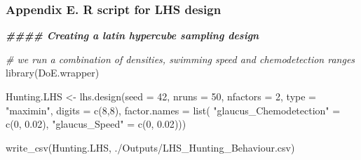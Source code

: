 \documentclass[
]{article}
\newenvironment{Shaded}{\begin{snugshade}}{\end{snugshade}}
\newcommand{\AttributeTok}[1]{\textcolor[rgb]{0.77,0.63,0.00}{#1}}
\newcommand{\CommentTok}[1]{\textcolor[rgb]{0.56,0.35,0.01}{\textit{#1}}}
\newcommand{\DecValTok}[1]{\textcolor[rgb]{0.00,0.00,0.81}{#1}}
\newcommand{\DocumentationTok}[1]{\textcolor[rgb]{0.56,0.35,0.01}{\textbf{\textit{#1}}}}
\newcommand{\FloatTok}[1]{\textcolor[rgb]{0.00,0.00,0.81}{#1}}
\newcommand{\FunctionTok}[1]{\textcolor[rgb]{0.00,0.00,0.00}{#1}}
\newcommand{\NormalTok}[1]{#1}
\newcommand{\OtherTok}[1]{\textcolor[rgb]{0.56,0.35,0.01}{#1}}
\newcommand{\StringTok}[1]{\textcolor[rgb]{0.31,0.60,0.02}{#1}}
\begin{document}
\hypertarget{appendix-e.-r-script-for-lhs-design}{%
\subsubsection{Appendix E. R script for LHS
design}\label{appendix-e.-r-script-for-lhs-design}}

\begin{Shaded}
\begin{Highlighting}[]
\DocumentationTok{\#\#\#\# Creating a latin hypercube sampling design}

\CommentTok{\# we run a combination of densities, swimming speed and chemodetection ranges}
\FunctionTok{library}\NormalTok{(DoE.wrapper)}


\NormalTok{Hunting.LHS }\OtherTok{\textless{}{-}} \FunctionTok{lhs.design}\NormalTok{(}\AttributeTok{seed =} \DecValTok{42}\NormalTok{,}
  \AttributeTok{nruns =} \DecValTok{50}\NormalTok{,}
  \AttributeTok{nfactors =} \DecValTok{2}\NormalTok{,}
  \AttributeTok{type =} \StringTok{"maximin"}\NormalTok{,}
  \AttributeTok{digits =} \FunctionTok{c}\NormalTok{(}\DecValTok{8}\NormalTok{,}\DecValTok{8}\NormalTok{),}
  \AttributeTok{factor.names =} \FunctionTok{list}\NormalTok{(}
    \StringTok{"glaucus\_Chemodetection"} \OtherTok{=} \FunctionTok{c}\NormalTok{(}\DecValTok{0}\NormalTok{, }\FloatTok{0.02}\NormalTok{),}
    \StringTok{"glaucus\_Speed"} \OtherTok{=} \FunctionTok{c}\NormalTok{(}\DecValTok{0}\NormalTok{, }\FloatTok{0.02}\NormalTok{)))}

\FunctionTok{write\_csv}\NormalTok{(Hunting.LHS, }\StringTok{\textquotesingle{}./Outputs/LHS\_Hunting\_Behaviour.csv\textquotesingle{}}\NormalTok{)}
\end{Highlighting}
\end{Shaded}
\end{document}
